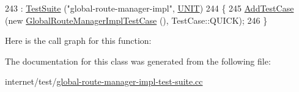 \begin{DoxyCode}
243   : \hyperlink{classns3_1_1TestSuite_a904b0c40583b744d30908aeb94636d1a}{TestSuite} (\textcolor{stringliteral}{"global-route-manager-impl"}, \hyperlink{classns3_1_1TestSuite_a1ebfcab34ec8161e085e8e3a1855eae0a3885375a3787abf60431f8454b3cadbd}{UNIT})
244 \{
245   \hyperlink{classns3_1_1TestCase_a3718088e3eefd5d6454569d2e0ddd835}{AddTestCase} (\textcolor{keyword}{new} \hyperlink{classGlobalRouteManagerImplTestCase}{GlobalRouteManagerImplTestCase} (), 
      TestCase::QUICK);
246 \}
\end{DoxyCode}


Here is the call graph for this function\+:




The documentation for this class was generated from the following file\+:\begin{DoxyCompactItemize}
\item 
internet/test/\hyperlink{global-route-manager-impl-test-suite_8cc}{global-\/route-\/manager-\/impl-\/test-\/suite.\+cc}\end{DoxyCompactItemize}
